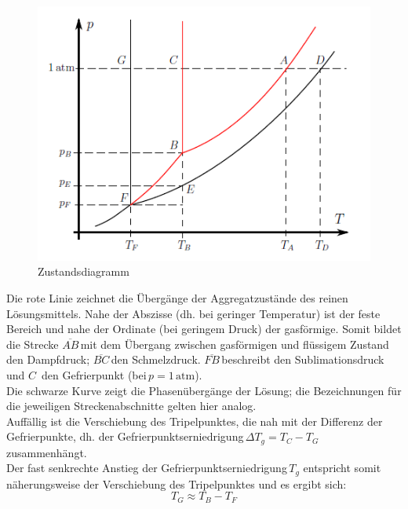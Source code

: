 \documentclass[12pt,a4paper,titlepage,headinclude,bibtotoc]{scrartcl}
\begin{document}
\newpage

\begin{figure} [h!]
\begin{center}
\includegraphics[scale=1]{Phasendiagramm.png} \end{center}
\caption {Zustandsdiagramm \protect\footnotemark}
\end{figure}

Die rote Linie zeichnet die Übergänge der Aggregatzustände des reinen Lösungsmittels. Nahe der Abszisse (dh. bei geringer Temperatur) ist der feste Bereich und nahe der Ordinate (bei geringem Druck) der gasförmige.
Somit bildet die Strecke $\overline{AB}$\,mit dem Übergang zwischen gasförmigen und flüssigem Zustand den Dampfdruck; $\overline{BC}$\,den Schmelzdruck. $\overline{FB}$\,beschreibt den Sublimationsdruck und $C$\, den Gefrierpunkt (bei\,$p= 1\,\mathrm{atm}$).\\
Die schwarze Kurve zeigt die Phasenübergänge der Lösung; die Bezeichnungen für die jeweiligen Streckenabschnitte gelten hier analog.\\
Auffällig ist die Verschiebung des Tripelpunktes, die nah mit der Differenz der Gefrierpunkte, dh. der Gefrierpunktserniedrigung\,$\Delta T_g = T_C - T_G$ zusammenhängt. \\
Der fast senkrechte Anstieg der Gefrierpunktserniedrigung\,$T_g$ entspricht somit näherungsweise der Verschiebung des Tripelpunktes und es ergibt sich:  \\

\begin{equation}
T_G \approx T_B - T_F
\end{equation}
\end{document}
